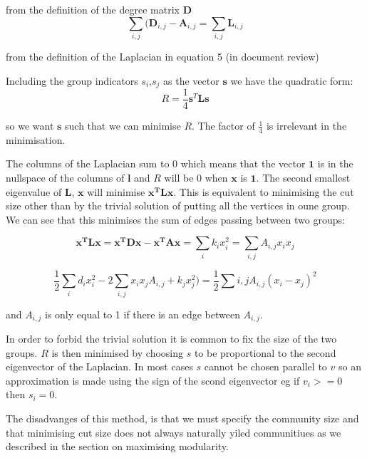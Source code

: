 from the definition of the degree matrix $\mathbf{D}$
\begin{equation}
\sum_{i,j} (\mathbf{D}_{i,j} -\mathbf{A}_{i,j} = \sum_{i,j} \mathbf{L}_{i,j}
\end{equation}

from the definition of the Laplacian in equation 5 (in document review)

Including the group indicators $s_i$,$s_j$ as the vector $\mathbf{s}$ we have the quadratic form:
\begin{equation}
R=\frac{1}{4}\mathbf{s}^T\mathbf{L}\mathbf{s}
\end{equation}

so we want $\mathbf{s}$ such that we can minimise $R$. The factor of $\frac{1}{4}$ is irrelevant in the minimisation.

The columns of the Laplacian sum to 0 which means that the vector $\mathbf{1}$ is in the nullspace of the columns of $\mathbf{l}$ and $R$ will be 0 when $\mathbf{x}$ is $\mathbf{1}$. The second smallest eigenvalue of $\mathbf{L}$, $\mathbf{x}$ will minimise $\mathbf{x^T}\mathbf{L}\mathbf{x}$.
This is equivalent to minimising the cut size other than by the trivial solution of putting all the vertices in oune group. We can see that this minimises the sum of edges passing between two groups:

\begin{equation}
\mathbf{x^T}\mathbf{L}\mathbf{x}=\mathbf{x^T}\mathbf{D}\mathbf{x}-\mathbf{x^T}\mathbf{A}\mathbf{x}=\sum_i k_i x_i^2 = \sum_{i,j} A_{i,j}x_i x_j
\end{equation}

\begin{equation}
\frac{1}{2}\sum_i d_i x_i^2 - 2 \sum_{i,j} x_i x_j A_{i,j} + k_jx_j^2)=\frac{1}{2}\sum{i,j}A_{i,j}(x_i - x_j)^2
\end{equation}

and $A_{i,j}$ is only equal to 1 if there is an edge between $A_{i,j}$.

In order to forbid the trivial solution it is common to fix the size of the two groups. $R$ is then minimised by choosing $s$ to be proportional to the second eigenvector of the Laplacian. In most cases $s$ cannot be chosen parallel to $v$ so an approximation is made using the sign of the scond eigenvector eg if $v_i>=0$ then $s_i=0$.

The disadvanges of this method, is that we must specify the community size and that minimising cut size does not always naturally yiled communitiues as we described in the section on maximising modularity.


